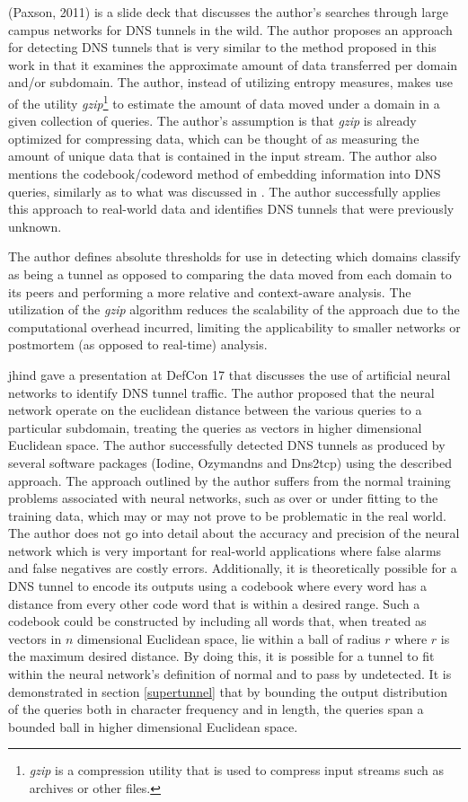 \documentclass[12pt]{report}
\theoremstyle{remark}
\theoremstyle{definition}
\theoremstyle{definition}
\theoremstyle{definition}
\begin{document}
(Paxson, 2011)\cite{Paxson2011} is a slide deck that discusses the author's
searches through large campus networks for DNS tunnels in the wild. The author
proposes an approach for detecting DNS tunnels that is very similar to the
method proposed in this work in that it examines the approximate amount of data
transferred per domain and/or subdomain. The author, instead of utilizing
entropy measures, makes use of the utility \emph{gzip}\footnote{\emph{gzip} is a
compression utility that is used to compress input streams such as archives or
other files.} to estimate the amount of data moved under a domain in a given
collection of queries. The author's assumption is that \emph{gzip} is already optimized
for compressing data, which can be thought of as measuring the amount of unique
data that is contained in the input stream. The author also mentions the
codebook/codeword method of embedding information into DNS queries, similarly as
to what was discussed in \cite{Butler2011}. The author successfully applies this
approach to real-world data and identifies DNS tunnels that were previously
unknown.

The author defines absolute thresholds for use in detecting which domains
classify as being a tunnel as opposed to comparing the data moved from each
domain to its peers and performing a more relative and context-aware analysis.
The utilization of the \emph{gzip} algorithm reduces the scalability of the approach
due to the computational overhead incurred, limiting the applicability to
smaller networks or postmortem (as opposed to real-time) analysis.

jhind\cite{jhind2009} gave a presentation at DefCon 17 that discusses the use of
artificial neural networks to identify DNS tunnel traffic. The author proposed
that the neural network operate on the euclidean distance between the various
queries to a particular subdomain, treating the queries as vectors in higher
dimensional Euclidean space. The author successfully detected DNS tunnels as
produced by several software packages (Iodine, Ozymandns and Dns2tcp) using the
described approach. The approach outlined by the author suffers from the normal
training problems associated with neural networks, such as over or under fitting
to the training data, which may or may not prove to be problematic in the real
world. The author does not go into detail about the accuracy and precision of
the neural network which is very important for real-world applications where
false alarms and false negatives are costly errors. Additionally, it is
theoretically possible for a DNS tunnel to encode its outputs using a codebook
where every word has a distance from every other code word that is within a
desired range. Such a codebook could be constructed by including all words that,
when treated as vectors in $n$ dimensional Euclidean space, lie within a ball of
radius $r$ where $r$ is the maximum desired distance. By doing this, it is
possible for a tunnel to fit within the neural network's definition of normal
and to pass by undetected. It is demonstrated in section \ref{supertunnel} that
by bounding the output distribution of the queries both in character frequency
and in length, the queries span a bounded ball in higher dimensional Euclidean
space.
\end{document}
